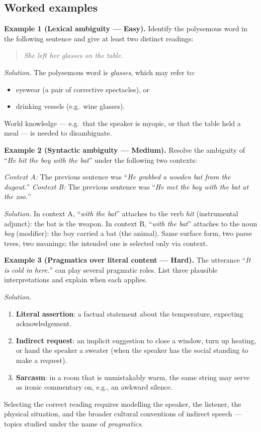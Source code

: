 \subsection{Worked examples}

\textbf{Example 1 (Lexical ambiguity --- Easy).}
Identify the polysemous word in the following sentence and give at least two distinct readings:
\begin{quote}
\emph{She left her glasses on the table.}
\end{quote}

\textit{Solution.} The polysemous word is \emph{glasses}, which may refer to:
\begin{itemize}
    \item eyewear (a pair of corrective spectacles), or
    \item drinking vessels (e.g.\ wine glasses).
\end{itemize}
World knowledge --- e.g.\ that the speaker is myopic, or that the table held a meal --- is needed to disambiguate.

\medskip

\textbf{Example 2 (Syntactic ambiguity --- Medium).}
Resolve the ambiguity of ``\emph{He hit the boy with the bat}'' under the following two contexts:

\textit{Context A:} The previous sentence was ``\emph{He grabbed a wooden bat from the dugout.}''
\textit{Context B:} The previous sentence was ``\emph{He met the boy with the bat at the zoo.}''

\textit{Solution.}
In context A, ``\emph{with the bat}'' attaches to the verb \emph{hit} (instrumental adjunct): the bat is the weapon.
In context B, ``\emph{with the bat}'' attaches to the noun \emph{boy} (modifier): the boy carried a bat (the animal). Same surface form, two parse trees, two meanings; the intended one is selected only via context.

\medskip

\textbf{Example 3 (Pragmatics over literal content --- Hard).}
The utterance ``\emph{It is cold in here.}'' can play several pragmatic roles. List three plausible interpretations and explain when each applies.

\textit{Solution.}
\begin{enumerate}
    \item \textbf{Literal assertion}: a factual statement about the temperature, expecting acknowledgement.
    \item \textbf{Indirect request}: an implicit suggestion to close a window, turn up heating, or hand the speaker a sweater (when the speaker has the social standing to make a request).
    \item \textbf{Sarcasm}: in a room that is unmistakably warm, the same string may serve as ironic commentary on, e.g., an awkward silence.
\end{enumerate}
Selecting the correct reading requires modelling the speaker, the listener, the physical situation, and the broader cultural conventions of indirect speech --- topics studied under the name of \emph{pragmatics}.


